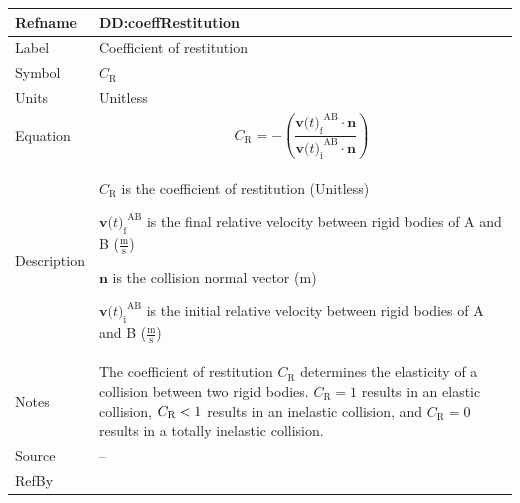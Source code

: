 \documentclass[12pt]{article}
\newcommand{\lt}{\ensuremath <}
\begin{document}
\vspace{\baselineskip}
\noindent
\begin{minipage}{\textwidth}
\begin{tabular}{>{\raggedright}p{}>{\raggedright\arraybackslash}p{}}
\toprule \textbf{Refname} & \textbf{DD:coeffRestitution}
\label{DD:coeffRestitution}
\\ \midrule
Label & Coefficient of restitution
        
\\ \midrule
Symbol & ${C_{\text{R}}}$
         
\\ \midrule
Units & Unitless
        
\\ \midrule
Equation & \begin{displaymath}
           {C_{\text{R}}}=-\left(\frac{{{\symbf{v}\text{(}t\text{)}_{\text{f}}}^{\text{A}\text{B}}}\cdot{}\symbf{n}}{{{\symbf{v}\text{(}t\text{)}_{\text{i}}}^{\text{A}\text{B}}}\cdot{}\symbf{n}}\right)
           \end{displaymath}
\\ \midrule
Description & \begin{symbDescription}
              \item{${C_{\text{R}}}$ is the coefficient of restitution (Unitless)}
              \item{${{\symbf{v}\text{(}t\text{)}_{\text{f}}}^{\text{A}\text{B}}}$ is the final relative velocity between rigid bodies of A and B ($\frac{\text{m}}{\text{s}}$)}
              \item{$\symbf{n}$ is the collision normal vector (${\text{m}}$)}
              \item{${{\symbf{v}\text{(}t\text{)}_{\text{i}}}^{\text{A}\text{B}}}$ is the initial relative velocity between rigid bodies of A and B ($\frac{\text{m}}{\text{s}}$)}
              \end{symbDescription}
\\ \midrule
Notes & The coefficient of restitution ${C_{\text{R}}}$ determines the elasticity of a collision between two rigid bodies. ${C_{\text{R}}}=1$ results in an elastic collision, ${C_{\text{R}}}\lt{}1$ results in an inelastic collision, and ${C_{\text{R}}}=0$ results in a totally inelastic collision.
        
\\ \midrule
Source & --
         
\\ \midrule
RefBy & 
\\ \bottomrule
\end{tabular}
\end{minipage}
\end{document}
